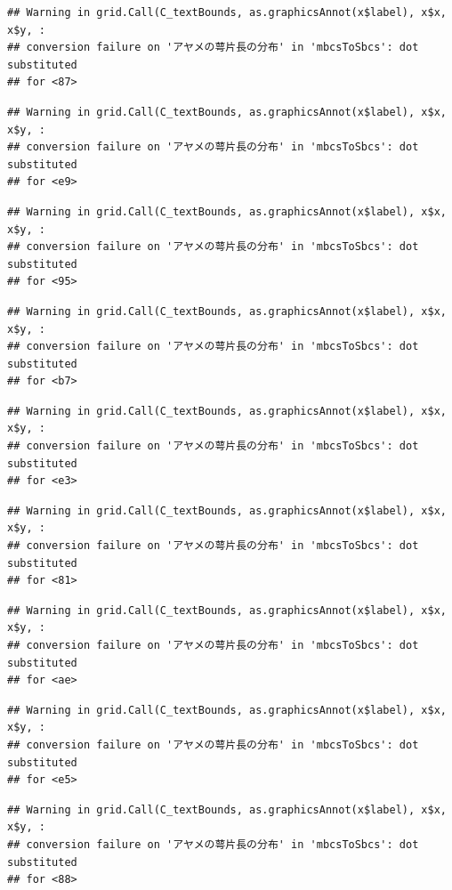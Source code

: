 \documentclass[
]{book}
\begin{document}
\begin{verbatim}
## Warning in grid.Call(C_textBounds, as.graphicsAnnot(x$label), x$x, x$y, :
## conversion failure on 'アヤメの萼片長の分布' in 'mbcsToSbcs': dot substituted
## for <87>
\end{verbatim}

\begin{verbatim}
## Warning in grid.Call(C_textBounds, as.graphicsAnnot(x$label), x$x, x$y, :
## conversion failure on 'アヤメの萼片長の分布' in 'mbcsToSbcs': dot substituted
## for <e9>
\end{verbatim}

\begin{verbatim}
## Warning in grid.Call(C_textBounds, as.graphicsAnnot(x$label), x$x, x$y, :
## conversion failure on 'アヤメの萼片長の分布' in 'mbcsToSbcs': dot substituted
## for <95>
\end{verbatim}

\begin{verbatim}
## Warning in grid.Call(C_textBounds, as.graphicsAnnot(x$label), x$x, x$y, :
## conversion failure on 'アヤメの萼片長の分布' in 'mbcsToSbcs': dot substituted
## for <b7>
\end{verbatim}

\begin{verbatim}
## Warning in grid.Call(C_textBounds, as.graphicsAnnot(x$label), x$x, x$y, :
## conversion failure on 'アヤメの萼片長の分布' in 'mbcsToSbcs': dot substituted
## for <e3>
\end{verbatim}

\begin{verbatim}
## Warning in grid.Call(C_textBounds, as.graphicsAnnot(x$label), x$x, x$y, :
## conversion failure on 'アヤメの萼片長の分布' in 'mbcsToSbcs': dot substituted
## for <81>
\end{verbatim}

\begin{verbatim}
## Warning in grid.Call(C_textBounds, as.graphicsAnnot(x$label), x$x, x$y, :
## conversion failure on 'アヤメの萼片長の分布' in 'mbcsToSbcs': dot substituted
## for <ae>
\end{verbatim}

\begin{verbatim}
## Warning in grid.Call(C_textBounds, as.graphicsAnnot(x$label), x$x, x$y, :
## conversion failure on 'アヤメの萼片長の分布' in 'mbcsToSbcs': dot substituted
## for <e5>
\end{verbatim}

\begin{verbatim}
## Warning in grid.Call(C_textBounds, as.graphicsAnnot(x$label), x$x, x$y, :
## conversion failure on 'アヤメの萼片長の分布' in 'mbcsToSbcs': dot substituted
## for <88>
\end{verbatim}
\end{document}
